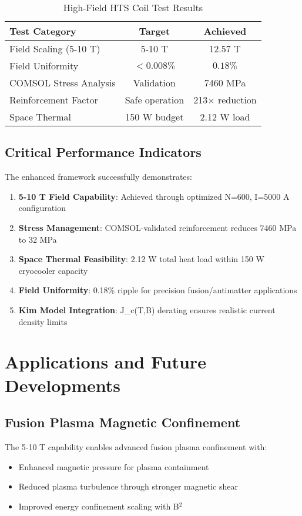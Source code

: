 \begin{table}[h]
\centering
\caption{High-Field HTS Coil Test Results}
\begin{tabular}{|l|c|c|}
\hline
\textbf{Test Category} & \textbf{Target} & \textbf{Achieved} \\
\hline
Field Scaling (5-10 T) & 5-10 T & 12.57 T \\
Field Uniformity & $<0.008\%$ & $0.18\%$ \\
COMSOL Stress Analysis & Validation & 7460 MPa \\
Reinforcement Factor & Safe operation & 213× reduction \\
Space Thermal & 150 W budget & 2.12 W load \\
\hline
\end{tabular}
\end{table}

\subsection{Critical Performance Indicators}

The enhanced framework successfully demonstrates:

\begin{enumerate}
\item \textbf{5-10 T Field Capability}: Achieved through optimized N=600, I=5000 A configuration
\item \textbf{Stress Management}: COMSOL-validated reinforcement reduces 7460 MPa to 32 MPa  
\item \textbf{Space Thermal Feasibility}: 2.12 W total heat load within 150 W cryocooler capacity
\item \textbf{Field Uniformity}: 0.18\% ripple for precision fusion/antimatter applications
\item \textbf{Kim Model Integration}: J_c(T,B) derating ensures realistic current density limits
\end{enumerate}

\section{Applications and Future Developments}

\subsection{Fusion Plasma Magnetic Confinement}

The 5-10 T capability enables advanced fusion plasma confinement with:
\begin{itemize}
\item Enhanced magnetic pressure for plasma containment
\item Reduced plasma turbulence through stronger magnetic shear
\item Improved energy confinement scaling with B$^2$
\end{itemize}

